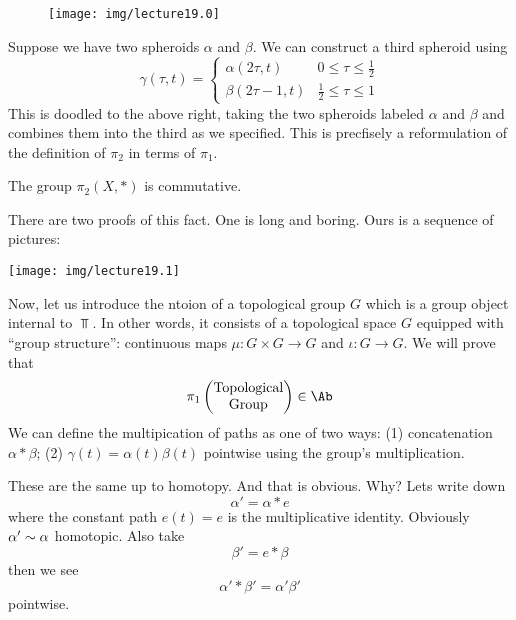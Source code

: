 \begin{wrapfigure}{r}{1.75in}
  \vspace{-20pt}
  \centering
  \texttt{[image: img/lecture19.0]}
  \end{wrapfigure}
Suppose we have two spheroids $\alpha$ and $\beta$. 
We can construct a third spheroid using
\begin{equation}
\gamma(\tau,t)=\begin{cases}\alpha(2\tau,t) & 0\leq\tau\leq\frac{1}{2}\\ 
\beta(2\tau-1,t) & \frac{1}{2}\leq\tau\leq1
\end{cases}
\end{equation}
This is doodled to the above right, taking the two spheroids
labeled $\alpha$ and $\beta$ and combines them into the third as
we specified. This is precfisely a reformulation of the
definition of $\pi_2$ in terms of $\pi_1$.

\begin{thm}
The group $\pi_{2}(X,*)$ is commutative.
\end{thm}
There are two proofs of this fact. One is long and boring. Ours
is a sequence of pictures:

\texttt{[image: img/lecture19.1]}

\bigskip
Now, let us introduce the ntoion of a topological
group
$G$ which is a group object internal to $\Top$. In other words,
it consists of a topological space $G$ equipped with ``group
structure'': continuous maps $\mu\colon G\times G\to G$ and
$\iota\colon G\to G$. We will prove that
\begin{equation}
\pi_{1}\begin{pmatrix}\mbox{Topological}\\
\mbox{Group}
\end{pmatrix}\in\Ab
\end{equation}
We can define the multipication of paths as one of two ways: (1)
concatenation $\alpha*\beta$; (2) $\gamma(t)=\alpha(t)\beta(t)$
pointwise using the group's multiplication.

These are the same up to homotopy. And that is obvious. Why? Lets
write down
\begin{equation}
\alpha'=\alpha * e
\end{equation}
where the constant path $e(t)=e$ is the multiplicative identity. Obviously
$\alpha'\sim\alpha$ homotopic.
Also take
\begin{equation}
\beta'=e*\beta
\end{equation}
then we see
\begin{equation}
\alpha'*\beta' = \alpha'\beta'
\end{equation}
pointwise. 

